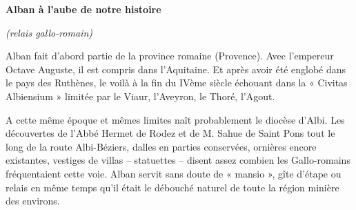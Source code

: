 
\thispagestyle{plain}

\vspace*{12mm}

\begin{center}
    {\Large\bfseries Alban à l'aube de notre histoire}

    \vspace{2mm}
    {\itshape (relais gallo-romain)}
\end{center}

\vspace{18mm}

\noindent
Alban fait d'abord partie de la province romaine (Provence).
Avec l'empereur Octave Auguste, il est compris dans l'Aquitaine.
Et après avoir été englobé dans le pays des Ruthènes, le voilà à la
fin du IVème siècle échouant dans la « Civitas Albiensium » limitée
par le Viaur, l'Aveyron, le Thoré, l'Agout.

\par\vspace{9mm}

\noindent
A cette même époque et mêmes limites naît probablement le diocèse
d'Albi. Les découvertes de l'Abbé Hermet de Rodez et de M. Sahue de
Saint Pons tout le long de la route Albi-Béziers, dalles en parties
conservées, ornières encore existantes, vestiges de villas --
statuettes -- disent assez combien les Gallo-romains fréquentaient
cette voie. Alban servit sans doute de « mansio », gîte d'étape ou
relais en même temps qu'il était le débouché naturel de toute la
région minière des environs.

\vfill
